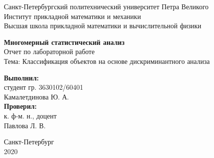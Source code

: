 \begin{titlepage}

\begin{center}
\large{Санкт-Петербургский политехнический университет Петра Великого\\
Институт прикладной математики и механики\\
Высшая школа прикладной математики и вычислительной физики\\}
\end{center}


\vspace{4cm}

\begin{center}
{\huge {\textbf{Многомерный статистический анализ}}}\\

\bigskip 
\large{{Отчет по лабораторной работе} \\
Тема: {Классификация объектов на основе дискриминантного анализа}}
\end{center}

\vspace{2.5cm}

\begin{flushleft}
    \begin{minipage}{0.35\textwidth}
        \textbf{Выполнил:} \\
        студент гр. 3630102/60401 \\ {Камалетдинова Ю. А.} \\ 

        \vspace{0.5cm} 
        \textbf{Проверил:} \\
        к. ф-м. н., доцент \\ {Павлова Л. В.}
        \vspace{1cm}
    \end{minipage}

\end{flushleft}

\vspace{0.5cm}

\begin{center}
Санкт-Петербург\\
2020
\end{center}

\end{titlepage}
